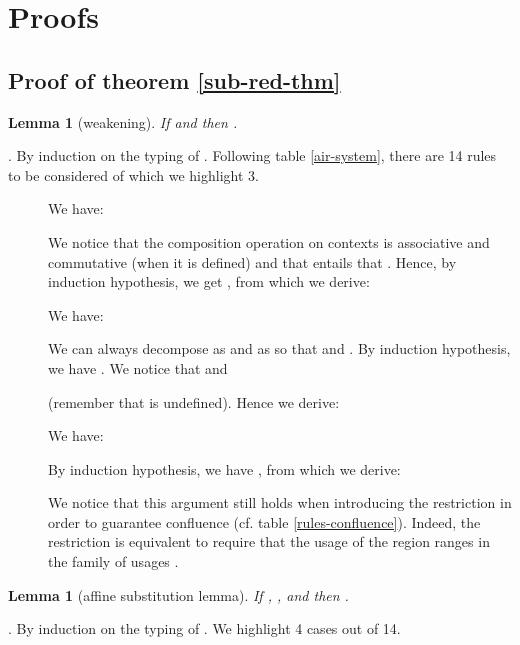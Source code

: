 \documentclass[11pt]{article}
\newtheorem{lemma}[theorem]{Lemma}
\newcommand{\Proof}{\noindent {\sc Proof}. }
\newcommand{\qed}{\hfill}
\begin{document}
\newpage
\appendix

\section{Proofs}\label{appendix-proof}

\subsection{Proof of theorem \ref{sub-red-thm}}

\begin{lemma}[weakening]
  \label{weak-lem}
  If  and  then .
\end{lemma}
\Proof
  By induction on the typing of . Following table
\ref{air-system}, there are 14 rules to be considered of which 
we highlight 3.

\begin{description}

\item[] We have:
    
We notice that the composition operation  on contexts is
associative and commutative (when it is defined) and that 
 entails that 
. 
Hence, by induction hypothesis, we get 
    , 
    from which we derive:
    


\item[]  We have:
    
    We can always decompose  as  and 
     as  so that 
     and 
     .
    By induction hypothesis, we have .
    We notice that  and 
     
    (remember that  is undefined). Hence 
    we derive:
    

\item[] We have:
    
    By induction hypothesis, we have , from which we derive:
    
We notice that this argument still holds when introducing 
the restriction   in order to guarantee confluence
(cf. table \ref{rules-confluence}). Indeed, the restriction 
 is equivalent to require that the
usage of the region  ranges in the family of usages
. \qed
  \end{description}



\begin{lemma}[affine substitution lemma] \label{aff-sub-lem}
  If ,
     ,  and 
      then 
     .
\end{lemma}
\Proof
  By induction on the typing  of . We highlight 
  4 cases out of 14.
\end{document}
